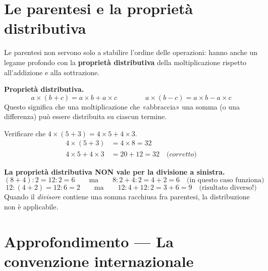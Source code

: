 \section{Le parentesi e la proprietà distributiva}

Le parentesi non servono solo a stabilire l'ordine delle operazioni:
hanno anche un legame profondo con la \textbf{proprietà distributiva}
della moltiplicazione rispetto all'addizione e alla sottrazione.

\begin{regola}
    \textbf{Proprietà distributiva.}
    \[
        a \times (b + c) = a \times b + a \times c
        \qquad\qquad
        a \times (b - c) = a \times b - a \times c
    \]
    Questo significa che una moltiplicazione che «abbraccia» una somma
    (o una differenza) può essere distribuita su ciascun termine.
\end{regola}

\begin{esempio}
    Verificare che $4 \times (5 + 3) = 4 \times 5 + 4 \times 3$.
    \begin{align*}
        4 \times (5 + 3)        & = 4 \times 8 = 32                       \\
        4 \times 5 + 4 \times 3 & = 20 + 12 = 32 \quad\textit{(corretto)}
    \end{align*}
\end{esempio}

\begin{attenzione}
    \textbf{La proprietà distributiva NON vale per la divisione a sinistra.}
    \[
        (8 + 4) : 2 = 12 : 2 = 6
        \qquad\text{ma}\qquad
        8 : 2 + 4 : 2 = 4 + 2 = 6 \quad \text{(in questo caso funziona)}
    \]
    \[
        12 : (4 + 2) = 12 : 6 = 2
        \qquad\text{ma}\qquad
        12 : 4 + 12 : 2 = 3 + 6 = 9 \quad \text{(risultato diverso!)}
    \]
    Quando il \emph{divisore} contiene una somma racchiusa fra parentesi,
    la distribuzione non è applicabile.
\end{attenzione}

\section*{Approfondimento — La convenzione internazionale}

